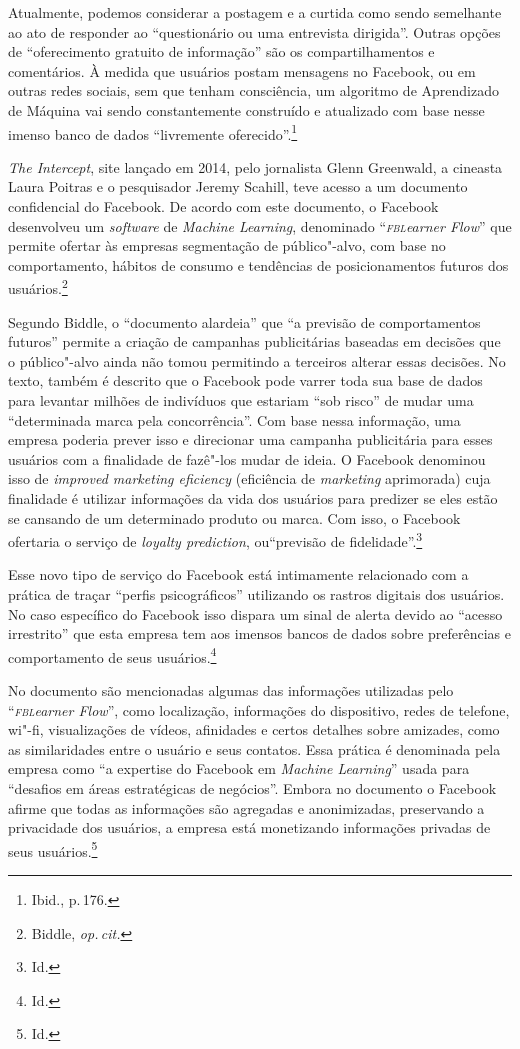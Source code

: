 Atualmente, podemos considerar a postagem e a curtida como sendo
semelhante ao ato de responder ao ``questionário ou uma entrevista
dirigida''. Outras opções de ``oferecimento gratuito de informação'' são
os compartilhamentos e comentários. À medida que usuários postam
mensagens no Facebook, ou em outras redes sociais, sem que tenham
consciência, um algoritmo de Aprendizado de Máquina vai sendo
constantemente construído e atualizado com base nesse imenso banco de
dados ``livremente oferecido''.\footnote{Ibid., p.\,176.}

\emph{The Intercept}, site lançado em 2014, pelo jornalista Glenn
Greenwald, a cineasta Laura Poitras e o pesquisador Jeremy Scahill, teve
acesso a um documento confidencial do Facebook. De acordo com este
documento, o Facebook desenvolveu um \emph{software} de \emph{Machine
Learning}, denominado ``\emph{\textsc{fbl}earner Flow}'' que permite ofertar às
empresas segmentação de público"-alvo, com base no comportamento,
hábitos de consumo e tendências de posicionamentos futuros dos usuários.\footnote{Biddle, \textit{op.\,cit.}}

Segundo Biddle, o ``documento alardeia'' que ``a previsão de
comportamentos futuros'' permite a criação de campanhas publicitárias
baseadas em decisões que o público"-alvo ainda não tomou permitindo a
terceiros alterar essas decisões. No texto, também é descrito que o
Facebook pode varrer toda sua base de dados para levantar milhões de
indivíduos que estariam ``sob risco'' de mudar uma ``determinada marca
pela concorrência''. Com base nessa informação, uma empresa poderia
prever isso e direcionar uma campanha publicitária para esses usuários
com a finalidade de fazê"-los mudar de ideia.
O Facebook denominou isso de \emph{improved marketing eficiency} (eficiência de \emph{marketing}
aprimorada) cuja finalidade é utilizar informações da vida dos usuários
para predizer se eles estão se cansando de um determinado produto ou
marca. Com isso, o Facebook ofertaria o serviço de \emph{loyalty
prediction}, ou``previsão de fidelidade''.\footnote{Id.}

Esse novo tipo de serviço do Facebook está intimamente relacionado com a
prática de traçar ``perfis psicográficos'' utilizando os rastros
digitais dos usuários. No caso específico do Facebook isso dispara um
sinal de alerta devido ao ``acesso irrestrito'' que esta empresa tem aos
imensos bancos de dados sobre preferências e comportamento de seus
usuários.\footnote{Id.}

No documento são mencionadas algumas das informações utilizadas pelo
``\emph{\textsc{fbl}earner Flow}'', como localização, informações do dispositivo,
redes de telefone, wi"-fi, visualizações de vídeos, afinidades e certos
detalhes sobre amizades, como as similaridades entre o usuário e seus
contatos. Essa prática é denominada pela empresa como ``a expertise do
Facebook em \emph{Machine Learning}'' usada para ``desafios em áreas
estratégicas de negócios''. Embora no documento o Facebook afirme que
todas as informações são agregadas e anonimizadas, preservando a
privacidade dos usuários, a empresa está monetizando informações
privadas de seus usuários.\footnote{Id.}

